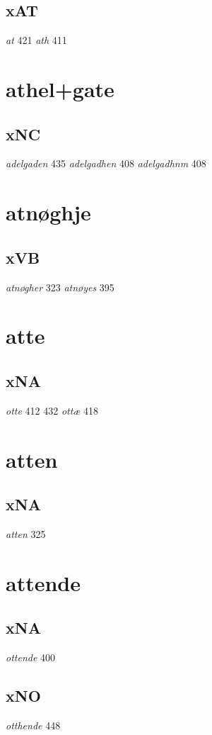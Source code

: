 \documentclass[a4paper,twocolumn]{article}
\begin{document}
\subsection{xAT}
\label{sec:orgea1afdc}
\emph{at} 421 \emph{ath} 411 
\section{athel+gate}
\label{sec:orgfa22538}
\subsection{xNC}
\label{sec:org461b527}
\emph{adelgaden} 435 \emph{adelgadhen} 408 \emph{adelgadhnm} 408 
\section{atnøghje}
\label{sec:orgcb4222d}
\subsection{xVB}
\label{sec:org1fc7ac2}
\emph{atnøgher} 323 \emph{atnøyes} 395 
\section{atte}
\label{sec:org9f2ae87}
\subsection{xNA}
\label{sec:org333330e}
\emph{otte} 412 432 \emph{ottæ} 418 
\section{atten}
\label{sec:org571a77e}
\subsection{xNA}
\label{sec:org69cd67a}
\emph{atten} 325 
\section{attende}
\label{sec:org578d013}
\subsection{xNA}
\label{sec:orgc85632f}
\emph{ottende} 400 
\subsection{xNO}
\label{sec:org85ee8ed}
\emph{otthende} 448 
\end{document}
